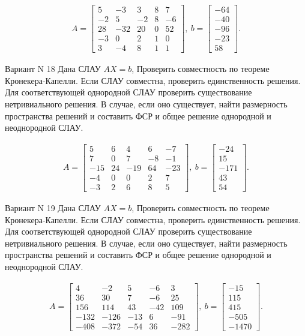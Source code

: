 \documentclass[11pt]{report}
\begin{document}
\begin{align*}
 A = \left[\begin{matrix}5 & -3 & 3 & 8 & 7\\-2 & 5 & -2 & 8 & -6\\28 & -32 & 20 & 0 & 52\\-3 & 0 & 2 & 1 & 0\\3 & -4 & 8 & 1 & 1\end{matrix}\right],
\ b = \left[\begin{matrix}-64\\-40\\-96\\-23\\58\end{matrix}\right]. 
 \end{align*}

Вариант N 18
Дана СЛАУ $AX = b$,
Проверить совместность по теореме Кронекера-Капелли. Если СЛАУ совместна, проверить единственность решения.
Для соответствующей однородной СЛАУ проверить существование нетривиального решения. В случае, если оно существует,
найти размерность пространства решений и составить ФСР и общее решение однородной  и неоднородной СЛАУ.


\begin{align*}
 A = \left[\begin{matrix}5 & 6 & 4 & 6 & -7\\7 & 0 & 7 & -8 & -1\\-15 & 24 & -19 & 64 & -23\\-4 & 0 & 0 & 2 & 7\\-3 & 2 & 6 & 8 & 5\end{matrix}\right],
\ b = \left[\begin{matrix}-24\\15\\-171\\43\\54\end{matrix}\right]. 
 \end{align*}

Вариант N 19
Дана СЛАУ $AX = b$,
Проверить совместность по теореме Кронекера-Капелли. Если СЛАУ совместна, проверить единственность решения.
Для соответствующей однородной СЛАУ проверить существование нетривиального решения. В случае, если оно существует,
найти размерность пространства решений и составить ФСР и общее решение однородной  и неоднородной СЛАУ.


\begin{align*}
 A = \left[\begin{matrix}4 & -2 & 5 & -6 & 3\\36 & 30 & 7 & -6 & 25\\156 & 114 & 43 & -42 & 109\\-132 & -126 & -13 & 6 & -91\\-408 & -372 & -54 & 36 & -282\end{matrix}\right],
\ b = \left[\begin{matrix}-15\\115\\415\\-505\\-1470\end{matrix}\right]. 
 \end{align*}
\end{document}
